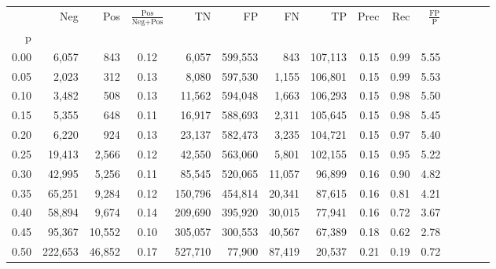 \begin{tabular}{rrrcrrrrrrrrrrr}
\toprule
{} &      Neg &     Pos & $\frac{\text{Pos}}{\text{Neg}+\text{Pos}}$ &       TN &       FP &       FN &       TP &  Prec &   Rec & $\frac{\text{FP}}{\text{P}}$ \\
p    &          &         &                                            &          &          &          &          &       &       &                              \\
\midrule
0.00 &    6,057 &     843 &                                       0.12 &    6,057 &  599,553 &      843 &  107,113 &  0.15 &  0.99 &                         5.55 \\
0.05 &    2,023 &     312 &                                       0.13 &    8,080 &  597,530 &    1,155 &  106,801 &  0.15 &  0.99 &                         5.53 \\
0.10 &    3,482 &     508 &                                       0.13 &   11,562 &  594,048 &    1,663 &  106,293 &  0.15 &  0.98 &                         5.50 \\
0.15 &    5,355 &     648 &                                       0.11 &   16,917 &  588,693 &    2,311 &  105,645 &  0.15 &  0.98 &                         5.45 \\
0.20 &    6,220 &     924 &                                       0.13 &   23,137 &  582,473 &    3,235 &  104,721 &  0.15 &  0.97 &                         5.40 \\
0.25 &   19,413 &   2,566 &                                       0.12 &   42,550 &  563,060 &    5,801 &  102,155 &  0.15 &  0.95 &                         5.22 \\
0.30 &   42,995 &   5,256 &                                       0.11 &   85,545 &  520,065 &   11,057 &   96,899 &  0.16 &  0.90 &                         4.82 \\
0.35 &   65,251 &   9,284 &                                       0.12 &  150,796 &  454,814 &   20,341 &   87,615 &  0.16 &  0.81 &                         4.21 \\
0.40 &   58,894 &   9,674 &                                       0.14 &  209,690 &  395,920 &   30,015 &   77,941 &  0.16 &  0.72 &                         3.67 \\
0.45 &   95,367 &  10,552 &                                       0.10 &  305,057 &  300,553 &   40,567 &   67,389 &  0.18 &  0.62 &                         2.78 \\
0.50 &  222,653 &  46,852 &                                       0.17 &  527,710 &   77,900 &   87,419 &   20,537 &  0.21 &  0.19 &                         0.72 \\

\end{tabular}
